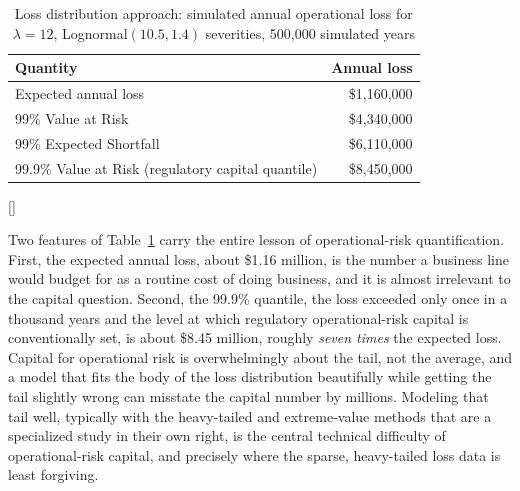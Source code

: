 \documentclass[../ai_in_finance]{subfiles}
\begin{document}
\begin{table}[htbp]
\centering
\begin{lrbox}{\bookmeasuredbox}
\begin{tabular}{lr}
\toprule
Quantity & Annual loss \\
\midrule
Expected annual loss & \$1{,}160{,}000 \\
99\% Value at Risk & \$4{,}340{,}000 \\
99\% Expected Shortfall & \$6{,}110{,}000 \\
99.9\% Value at Risk (regulatory capital quantile) & \$8{,}450{,}000 \\
\bottomrule
\end{tabular}
\end{lrbox}
\ifdim\wd\bookmeasuredbox<0.65\linewidth
\setlength{\bookcapwidth}{0.65\linewidth}
\else
\setlength{\bookcapwidth}{\wd\bookmeasuredbox}
\fi
{}[\bookcapwidth]{
\usebox{\bookmeasuredbox}
}{
\caption{Loss distribution approach: simulated annual operational loss for $\lambda=12$, Lognormal$(10.5, 1.4)$ severities, 500{,}000 simulated years}
\label{tab:oprisk-lda}
}
\end{table}

Two features of Table~\ref{tab:oprisk-lda} carry the entire lesson of operational-risk quantification. First, the expected annual loss, about \$1.16 million, is the number a business line would budget for as a routine cost of doing business, and it is almost irrelevant to the capital question. Second, the 99.9\% quantile, the loss exceeded only once in a thousand years and the level at which regulatory operational-risk capital is conventionally set, is about \$8.45 million, roughly \emph{seven times} the expected loss. Capital for operational risk is overwhelmingly about the tail, not the average, and a model that fits the body of the loss distribution beautifully while getting the tail slightly wrong can misstate the capital number by millions. Modeling that tail well, typically with the heavy-tailed and extreme-value methods that are a specialized study in their own right, is the central technical difficulty of operational-risk capital, and precisely where the sparse, heavy-tailed loss data is least forgiving.
\end{document}
